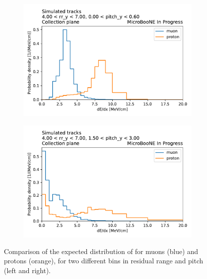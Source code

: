 \begin{figure}[H] 
\begin{center}
    \begin{subfigure}[b]{0.48\textwidth}
    \centering
    \includegraphics[width=1.00\textwidth]{llrpid/pdf_example_low_pitch.pdf}
    \end{subfigure}
    \begin{subfigure}[b]{0.48\textwidth}
    \centering
    \includegraphics[width=1.00\textwidth]{llrpid/pdf_example_large_pitch.pdf}
    \end{subfigure}
\caption{Comparison of the expected distribution of \dedx for muons (blue) and protons (orange), for two different bins in residual range and pitch (left and right).}
\label{fig:llr_pid_pdf_example}
\end{center}
\end{figure}

